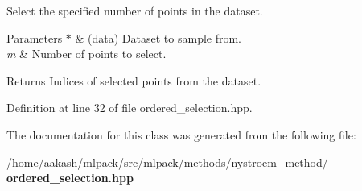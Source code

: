 Select the specified number of points in the dataset. 


\begin{DoxyParams}{Parameters}
{\em $\ast$} & (data) Dataset to sample from. \\
\hline
{\em m} & Number of points to select. \\
\hline
\end{DoxyParams}
\begin{DoxyReturn}{Returns}
Indices of selected points from the dataset. 
\end{DoxyReturn}


Definition at line 32 of file ordered\+\_\+selection.\+hpp.



The documentation for this class was generated from the following file\+:\begin{DoxyCompactItemize}
\item 
/home/aakash/mlpack/src/mlpack/methods/nystroem\+\_\+method/\textbf{ ordered\+\_\+selection.\+hpp}\end{DoxyCompactItemize}
